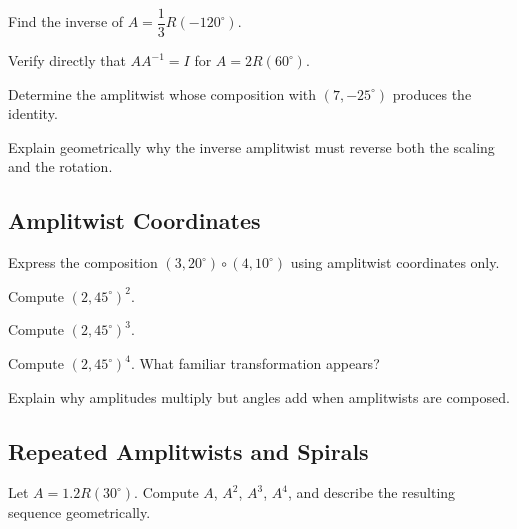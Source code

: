 \begin{exercise}
Find the inverse of $A = \dfrac13 R(-120^\circ)$.
\end{exercise}

\begin{exercise}
Verify directly that $AA^{-1} = I$ for $A = 2R(60^\circ)$.
\end{exercise}

\begin{exercise}
Determine the amplitwist whose composition with $(7,-25^\circ)$ produces
the identity.
\end{exercise}

\begin{exercise}
Explain geometrically why the inverse amplitwist must reverse both the
scaling and the rotation.
\end{exercise}

\subsection*{Amplitwist Coordinates}
\begin{exercise}
Express the composition $(3,20^\circ)\circ(4,10^\circ)$ using amplitwist
coordinates only.
\end{exercise}

\begin{exercise}
Compute $(2,45^\circ)^2$.
\end{exercise}

\begin{exercise}
Compute $(2,45^\circ)^3$.
\end{exercise}

\begin{exercise}
Compute $(2,45^\circ)^4$. What familiar transformation appears?
\end{exercise}

\begin{exercise}
Explain why amplitudes multiply but angles add when amplitwists are
composed.
\end{exercise}

\subsection*{Repeated Amplitwists and Spirals}
\begin{exercise}
Let $A = 1.2R(30^\circ)$. Compute $A$, $A^2$, $A^3$, $A^4$, and describe
the resulting sequence geometrically.
\end{exercise}

